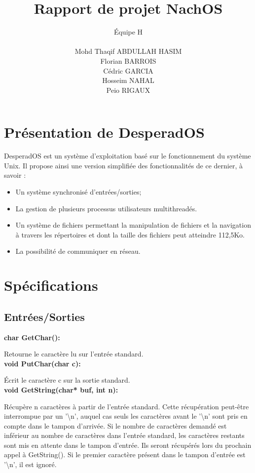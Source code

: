 \documentclass[12pt]{report}
\title{Rapport de projet NachOS}
\author{
\'Equipe H\\\\
Mohd Thaqif ABDULLAH HASIM\\
Florian BARROIS\\
Cédric GARCIA\\
Hosseim NAHAL\\
Peio RIGAUX\\
}
\begin{document}
\maketitle


\chapter{Présentation de DesperadOS}

DesperadOS est un système d'exploitation basé sur le fonctionnement du système Unix. Il propose ainsi une version simplifiée des fonctionnalités de ce dernier, à savoir :
\begin{itemize}\renewcommand{\labelitemi}{$\bullet$}
\item Un système synchronisé d'entrées/sorties;
\item La gestion de plusieurs processus utilisateurs multithreadés.
\item Un système de fichiers permettant la manipulation de fichiers et la navigation à travers les répertoires et dont la taille des fichiers peut atteindre 112,5Ko.
\item La possibilité de communiquer en réseau.

\end{itemize}


\chapter{Spécifications}
\section{Entrées/Sorties}
\bigskip
\textbf{char GetChar():}

Retourne le caractère lu sur l'entrée standard.\\

\bigskip
\textbf{void PutChar(char c):}

Écrit le caractère c sur la sortie standard.\\


\bigskip
\textbf{void GetString(char* buf, int n):}
 
Récupère n caractères à partir de l'entrée standard. Cette récupération peut-être interrompue par un '\textbackslash n',
auquel cas seuls les caractères avant le '\textbackslash n' sont pris en compte dans le tampon d'arrivée.
Si le nombre de caractères demandé est inférieur au nombre de caractères dans l'entrée standard, les caractères
restants sont mis en attente dans le tampon d'entrée. Ils seront récupérés lors du prochain appel à GetString().
Si le premier caractère présent dans le tampon d'entrée est '\textbackslash n', il est ignoré.
\end{document}
